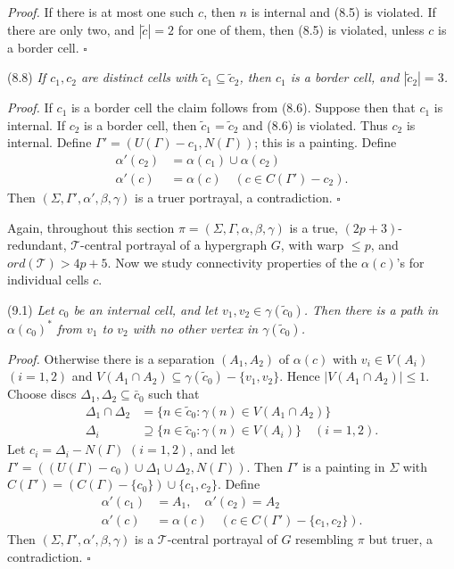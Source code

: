 \textit{Proof.} If there is at most one such $c$, then $n$ is internal and (8.5) is violated. If there are only two, and $|\tilde{c}| = 2$ for one of them, then (8.5) is violated, unless $c$ is a border cell. $\square$

\stmt
(8.8) \textit{If $c_1, c_2$ are distinct cells with $\tilde{c}_1 \subseteq \tilde{c}_2$, then $c_1$ is a border cell, and $|\tilde{c}_2| = 3$.}

\textit{Proof.} If $c_1$ is a border cell the claim follows from (8.6). Suppose then that $c_1$ is internal. If $c_2$ is a border cell, then $\tilde{c}_1 = \tilde{c}_2$ and (8.6) is violated. Thus $c_2$ is internal. Define $\Gamma' = (U(\Gamma) - c_1, N(\Gamma))$; this is a painting. Define
\begin{align*}
\alpha'(c_2) &= \alpha(c_1) \cup \alpha(c_2) \\
\alpha'(c) &= \alpha(c) \quad (c \in C(\Gamma') - c_2).
\end{align*}
Then $(\Sigma, \Gamma', \alpha', \beta, \gamma)$ is a truer portrayal, a contradiction. $\square$


Again, throughout this section $\pi = (\Sigma, \Gamma, \alpha, \beta, \gamma)$ is a true, $(2p + 3)$-redundant, $\mathcal{T}$-central portrayal of a hypergraph $G$, with warp $\le p$, and $ord(\mathcal{T}) > 4p + 5$. Now we study connectivity properties of the $\alpha(c)$'s for individual cells $c$.

\stmt
(9.1) \textit{Let $c_0$ be an internal cell, and let $v_1, v_2 \in \gamma(\tilde{c}_0)$. Then there is a path in $\alpha(c_0)^*$ from $v_1$ to $v_2$ with no other vertex in $\gamma(\tilde{c}_0)$.}

\textit{Proof.} Otherwise there is a separation $(A_1, A_2)$ of $\alpha(c)$ with $v_i \in V(A_i)$ $(i = 1, 2)$ and $V(A_1 \cap A_2) \subseteq \gamma(\tilde{c}_0) - \{v_1, v_2\}$. Hence $|V(A_1 \cap A_2)| \le 1$. Choose discs $\Delta_1, \Delta_2 \subseteq \bar{c}_0$ such that
\begin{align*}
\Delta_1 \cap \Delta_2 &= \{n \in \tilde{c}_0 : \gamma(n) \in V(A_1 \cap A_2)\} \\
\Delta_i &\supseteq \{n \in \tilde{c}_0 : \gamma(n) \in V(A_i)\} \quad (i = 1, 2).
\end{align*}
Let $c_i = \Delta_i - N(\Gamma)$ $(i = 1, 2)$, and let $\Gamma' = ((U(\Gamma) - c_0) \cup \Delta_1 \cup \Delta_2, N(\Gamma))$. Then $\Gamma'$ is a painting in $\Sigma$ with $C(\Gamma') = (C(\Gamma) - \{c_0\}) \cup \{c_1, c_2\}$. Define
\begin{align*}
\alpha'(c_1) &= A_1, \quad \alpha'(c_2) = A_2 \\
\alpha'(c) &= \alpha(c) \quad (c \in C(\Gamma') - \{c_1, c_2\}).
\end{align*}
Then $(\Sigma, \Gamma', \alpha', \beta, \gamma)$ is a $\mathcal{T}$-central portrayal of $G$ resembling $\pi$ but truer, a contradiction. $\square$
